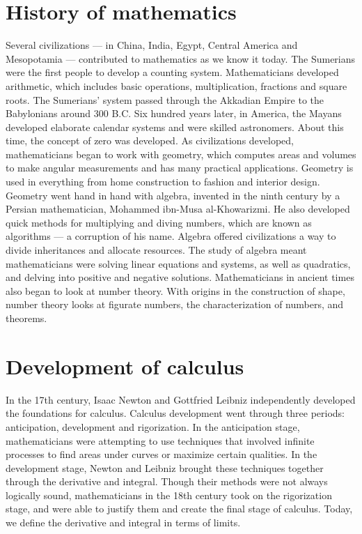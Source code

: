 \documentclass{article}
\begin{document}
\section{History of mathematics}
Several civilizations — in China, India, Egypt, Central America and Mesopotamia — contributed to mathematics as we know it today. The Sumerians were the first people to develop a counting system. Mathematicians developed arithmetic, which includes basic operations, multiplication, fractions and square roots. The Sumerians’ system passed through the Akkadian Empire to the Babylonians around 300 B.C. Six hundred years later, in America, the Mayans developed elaborate calendar systems and were skilled astronomers. About this time, the concept of zero was developed.\newline \newline 
As civilizations developed, mathematicians began to work with geometry, which computes areas and volumes to make angular measurements and has many practical applications. Geometry is used in everything from home construction to fashion and interior design.\newline \newline
Geometry went hand in hand with algebra, invented in the ninth century by a Persian mathematician, Mohammed ibn-Musa al-Khowarizmi. He also developed quick methods for multiplying and diving numbers, which are known as algorithms — a corruption of his name.\newline \newline
Algebra offered civilizations a way to divide inheritances and allocate resources. The study of algebra meant mathematicians were solving linear equations and systems, as well as quadratics, and delving into positive and negative solutions. Mathematicians in ancient times also began to look at number theory. With origins in the construction of shape, number theory looks at figurate numbers, the characterization of numbers, and theorems.
\section{Development of calculus}
In the 17th century, Isaac Newton and Gottfried Leibniz independently developed the foundations for calculus. Calculus development went through three periods: anticipation, development and rigorization. In the anticipation stage, mathematicians were attempting to use techniques that involved infinite processes to find areas under curves or maximize certain qualities. In the development stage, Newton and Leibniz brought these techniques together through the derivative and integral. Though their methods were not always logically sound, mathematicians in the 18th century took on the rigorization stage, and were able to justify them and create the final stage of calculus. Today, we define the derivative and integral in terms of limits.\newline \newline
\end{document}
